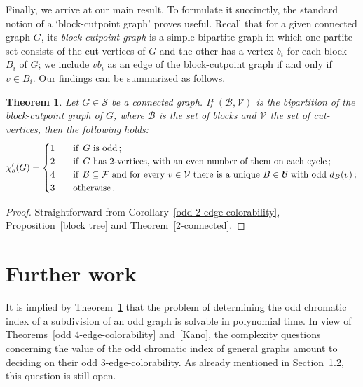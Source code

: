 \documentclass[a4paper,12pt]{article}
\newtheorem{theorem}{Theorem}[section]
\numberwithin{equation}{section}
\begin{document}

\bigskip

  Finally, we arrive at our main result. To formulate it succinctly, the standard notion of a `block-cutpoint graph' proves useful. Recall that for a given connected graph $G$, its \textit{block-cutpoint graph} is a simple bipartite graph in which one partite set consists of the cut-vertices of $G$ and the other has a vertex $b_i$ for each block $B_i$ of $G$; we include $vb_i$ as an edge of the block-cutpoint graph if and only if $v\in B_i$. Our findings can be summarized as follows.



\begin{theorem}
    \label{thm}
Let $G\in \mathcal{S}$ be a connected graph. If $(\mathcal{B},\mathcal{V})$ is the bipartition of the block-cutpoint graph of $G$, where $\mathcal{B}$ is the set of blocks and $\mathcal{V}$ the set of cut-vertices, then the following holds:
\begin{equation*}
\chi'_o(G)=
\begin{cases}
1 & \text{\quad if \,} G \text{ is odd} \,;\\
2 & \text{\quad if \,} G \text{ has 2-vertices, with an even number of them on each cycle}\,;\\
4 & \text{\quad if \,} \mathcal{B}\subseteq\mathcal{F} \text{ and for every }  v\in\mathcal{V} \text{ there is a unique } B\in\mathcal{B} \text{ with odd } d_B(v)\,;\\
3 & \text{\quad otherwise}\,.
\end{cases}
\end{equation*}
\end{theorem}
\begin{proof}
Straightforward from Corollary~\ref{odd 2-edge-colorability}, Proposition~\ref{block tree} and Theorem~\ref{2-connected}.
\end{proof}

\section{Further work}

It is implied by Theorem~\ref{thm} that the problem of determining the odd chromatic index of a subdivision of an odd graph is solvable in polynomial time. In view of Theorems~\ref{odd 4-edge-colorability} and~\ref{Kano}, the complexity questions concerning the value of the odd chromatic index of general graphs amount to deciding on their odd $3$-edge-colorability. As already mentioned in Section~1.2, this question is still open.
\end{document}
